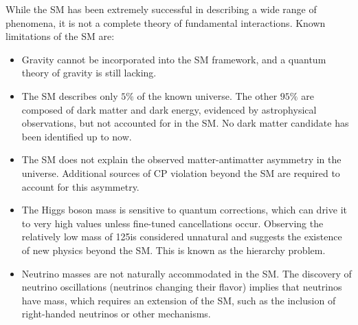 While the SM has been extremely successful in describing a wide range of phenomena, it is not a complete theory of fundamental interactions.
Known limitations of the SM are:
\begin{itemize}
	\item Gravity cannot be incorporated into the SM framework, and a quantum theory of gravity is still lacking.
	\item The SM describes only $5\%$ of the known universe. The other $95\%$ are composed of dark matter and dark energy,
	evidenced by astrophysical observations, but not accounted for in the SM. No dark matter candidate 
	has been identified up to now.
	\item The SM does not explain the observed matter-antimatter asymmetry in the universe.
	Additional sources of CP violation beyond the SM are required to account for this asymmetry.
	\item The Higgs boson mass is sensitive to quantum corrections, 
	which can drive it to very high values unless fine-tuned cancellations occur. 
	Observing the relatively low mass of 125\GeV is
    considered unnatural and suggests the existence of new physics beyond the SM.
    This is known as the hierarchy problem.
	\item Neutrino masses are not naturally accommodated in the SM. 
	The discovery of neutrino oscillations (neutrinos changing their flavor) implies that neutrinos have mass, 
	which requires an extension of the SM, such as the inclusion of right-handed neutrinos or other mechanisms.
\end{itemize}
